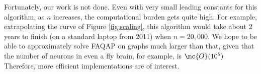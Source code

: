 \documentclass[10pt,journal,cspaper,compsoc]{IEEEtran}
\begin{document}


Fortunately, our work is not done. Even with very small leading constants for this algorithm, as $n$ increases, the computational burden gets quite high.  For example, extrapolating the curve of Figure \ref{fig:scaling}, this algorithm would take about 2 years to finish (on a standard laptop from 2011) when $n=20,000$.  We hope to be able to approximately solve FAQAP on graphs much larger than that, given that the number of neurons in even a fly brain, for example, is $\mc{O}(10^5)$.  Therefore, more efficient implementations are of interest.  

\end{document}
